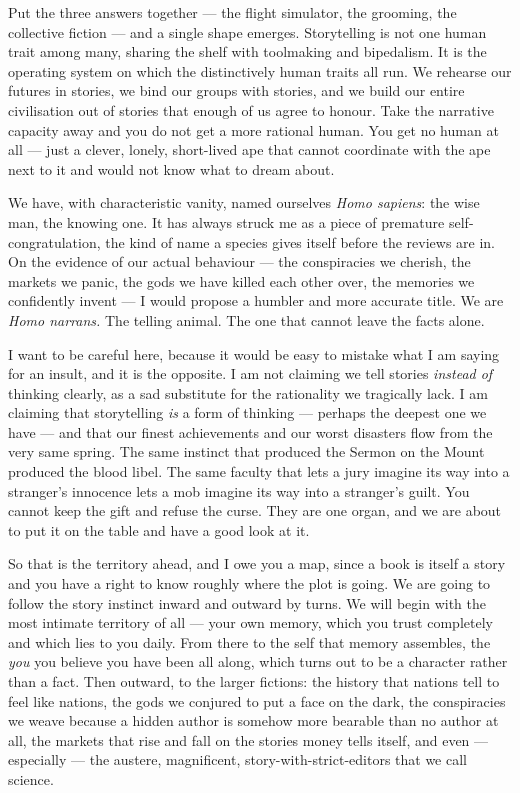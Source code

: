Put the three answers together — the flight simulator, the grooming, the collective fiction — and a single shape emerges. Storytelling is not one human trait among many, sharing the shelf with toolmaking and bipedalism. It is the operating system on which the distinctively human traits all run. We rehearse our futures in stories, we bind our groups with stories, and we build our entire civilisation out of stories that enough of us agree to honour. Take the narrative capacity away and you do not get a more rational human. You get no human at all — just a clever, lonely, short-lived ape that cannot coordinate with the ape next to it and would not know what to dream about.

We have, with characteristic vanity, named ourselves \emph{Homo sapiens}: the wise man, the knowing one. It has always struck me as a piece of premature self-congratulation, the kind of name a species gives itself before the reviews are in. On the evidence of our actual behaviour — the conspiracies we cherish, the markets we panic, the gods we have killed each other over, the memories we confidently invent — I would propose a humbler and more accurate title. We are \emph{Homo narrans.} The telling animal. The one that cannot leave the facts alone.

I want to be careful here, because it would be easy to mistake what I am saying for an insult, and it is the opposite. I am not claiming we tell stories \emph{instead of} thinking clearly, as a sad substitute for the rationality we tragically lack. I am claiming that storytelling \emph{is} a form of thinking — perhaps the deepest one we have — and that our finest achievements and our worst disasters flow from the very same spring. The same instinct that produced the Sermon on the Mount produced the blood libel. The same faculty that lets a jury imagine its way into a stranger's innocence lets a mob imagine its way into a stranger's guilt. You cannot keep the gift and refuse the curse. They are one organ, and we are about to put it on the table and have a good look at it.

So that is the territory ahead, and I owe you a map, since a book is itself a story and you have a right to know roughly where the plot is going. We are going to follow the story instinct inward and outward by turns. We will begin with the most intimate territory of all — your own memory, which you trust completely and which lies to you daily. From there to the self that memory assembles, the \emph{you} you believe you have been all along, which turns out to be a character rather than a fact. Then outward, to the larger fictions: the history that nations tell to feel like nations, the gods we conjured to put a face on the dark, the conspiracies we weave because a hidden author is somehow more bearable than no author at all, the markets that rise and fall on the stories money tells itself, and even — especially — the austere, magnificent, story-with-strict-editors that we call science.

